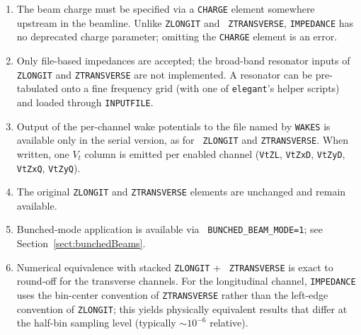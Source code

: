 \begin{enumerate}
\item The beam charge must be specified via a {\tt CHARGE} element
  somewhere upstream in the beamline.  Unlike {\tt ZLONGIT} and {\tt
  ZTRANSVERSE}, {\tt IMPEDANCE} has no deprecated charge parameter;
  omitting the {\tt CHARGE} element is an error.
\item Only file-based impedances are accepted; the broad-band
  resonator inputs of {\tt ZLONGIT} and {\tt ZTRANSVERSE} are not
  implemented.  A resonator can be pre-tabulated onto a fine
  frequency grid (with one of {\tt elegant}'s helper scripts) and
  loaded through {\tt INPUTFILE}.
\item Output of the per-channel wake potentials to the file named by
  {\tt WAKES} is available only in the serial version, as for {\tt
  ZLONGIT} and {\tt ZTRANSVERSE}.  When written, one $V_t$ column is
  emitted per enabled channel ({\tt VtZL}, {\tt VtZxD}, {\tt VtZyD},
  {\tt VtZxQ}, {\tt VtZyQ}).
\item The original {\tt ZLONGIT} and {\tt ZTRANSVERSE} elements are
  unchanged and remain available.
\item Bunched-mode application is available via {\tt
  BUNCHED\_BEAM\_MODE=1}; see
  Section~\ref{sect:bunchedBeams}.
\item Numerical equivalence with stacked {\tt ZLONGIT} + {\tt
  ZTRANSVERSE} is exact to round-off for the transverse channels.
  For the longitudinal channel, {\tt IMPEDANCE} uses the bin-center
  convention of {\tt ZTRANSVERSE} rather than the left-edge convention
  of {\tt ZLONGIT}; this yields physically equivalent results that
  differ at the half-bin sampling level (typically $\sim 10^{-6}$
  relative).
\end{enumerate}

